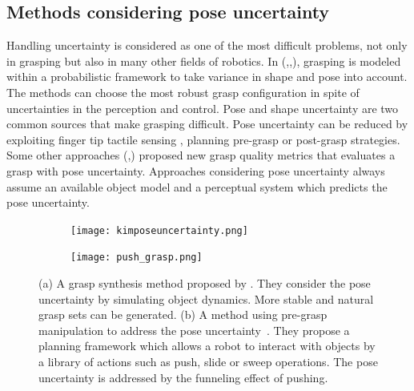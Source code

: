 \subsection{Methods considering pose uncertainty}
Handling uncertainty is considered as one of the most difficult problems, not only in grasping but also in many other fields of robotics. In (\cite{Goldberg1990},\cite{Hsiao2011},\cite{Chen2015}), grasping is modeled within a probabilistic framework to take variance in shape and pose into account. The methods can choose the most robust grasp configuration in spite of uncertainties in the perception and control. Pose and shape uncertainty are two common sources that make grasping difficult. Pose uncertainty can be reduced by exploiting finger tip tactile sensing \cite{Dang2014}\cite{Felip2009}\cite{Dragiev2013},  planning pre-grasp \cite{Dogar2011}\cite{Brost1988} or post-grasp \cite{Paolini2014} strategies. Some other approaches (\cite{Weisz2012},\cite{Kim2013}) proposed new grasp quality metrics that evaluates a grasp with pose uncertainty. Approaches considering pose uncertainty always assume an available object model and a perceptual system which predicts the pose uncertainty. 
\begin{figure}[!htbp]
    \centering
    \begin{subfigure}[b]{0.48\textwidth}
        \texttt{[image: kimposeuncertainty.png]}
        \caption{}
    \end{subfigure}
    \begin{subfigure}[b]{0.48\textwidth}
        \texttt{[image: push\_grasp.png]}
        \caption{}
    \end{subfigure}
    \caption{(a) A grasp synthesis method proposed by \cite{Kim2013}. They consider the pose uncertainty by  simulating object dynamics. More stable and natural grasp sets can be generated. (b) A method using pre-grasp manipulation to address the pose uncertainty~\cite{Dogar2011}. They propose a planning framework which allows a robot to interact with objects by a library of actions such as push, slide or sweep operations. The pose uncertainty is addressed by the funneling effect of pushing.}\label{fig:rw_pose_uncertainty}
\end{figure}

